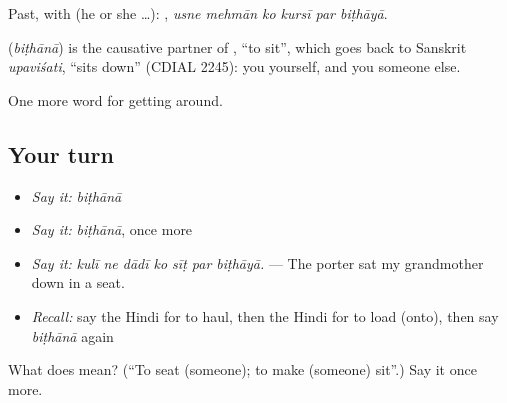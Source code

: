 Past, with  (he or she …):      , \emph{usne mehmān ko kursī par biṭhāyā}.

\begin{cousinweb}
\textbf{} (\emph{biṭhānā}) is the causative partner of , \textquotedblleft{}to sit\textquotedblright{}, which goes back to Sanskrit \emph{upaviśati}, \textquotedblleft{}sits down\textquotedblright{} (CDIAL 2245): you  yourself, and you  someone else.
\end{cousinweb}

\begin{grammarlens}[title={What you've built}]
One more word for getting around.
\end{grammarlens}

\subsection*{Your turn}
\begin{itemize}
\raggedright
  \item \emph{Say it:} \emph{biṭhānā}
  \item \emph{Say it:} \emph{biṭhānā}, once more
  \item \emph{Say it:} \emph{kulī ne dādī ko sīṭ par biṭhāyā.} — The porter sat my grandmother down in a seat.
  \item \emph{Recall:} say the Hindi for to haul, then the Hindi for to load (onto), then say \emph{biṭhānā} again
\end{itemize}

\begin{tcolorbox}[breakable,colback=teal!4,colframe=teal!35!black,title={Before you move on}]
What does  mean? (\textquotedblleft{}To seat (someone); to make (someone) sit\textquotedblright{}.) Say it once more.
\end{tcolorbox}
